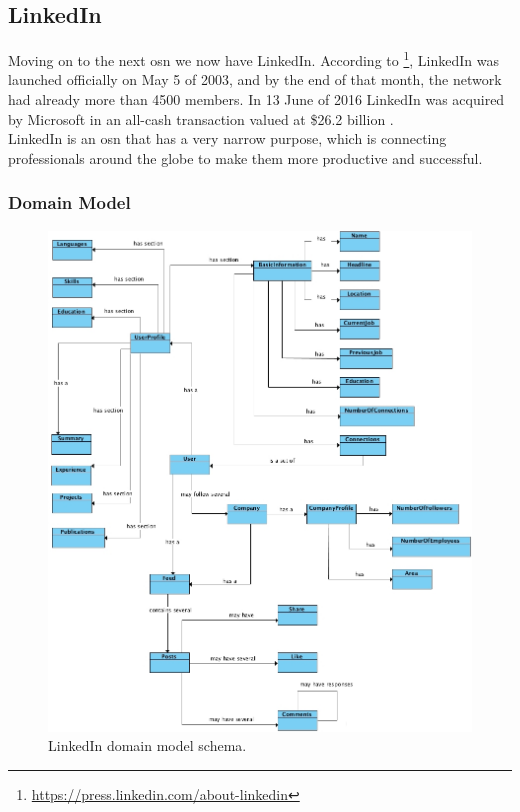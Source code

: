 \subsection{LinkedIn}

Moving on to the next \gls{osn} we now have LinkedIn. According to \footnote{\url{https://press.linkedin.com/about-linkedin}}, LinkedIn was launched officially on May 5 of 2003, and by the end of
that month, the network had already more than 4500 members. In 13 June of 2016 LinkedIn was acquired by Microsoft in an all-cash transaction valued at \$26.2
billion \citep{microlink}.\\
\indent LinkedIn is an \gls{osn} that has a very narrow purpose, which is
connecting professionals around the globe to make them more productive and successful.

\subsubsection*{Domain Model}

\begin{figure}[h!]
  \hspace*{-0.5in}
  \includegraphics[width=1.10\textwidth]{img/linkedin-domain-model.jpg}
\caption{\label{img:linkdomain} LinkedIn domain model schema.}
\end{figure}

